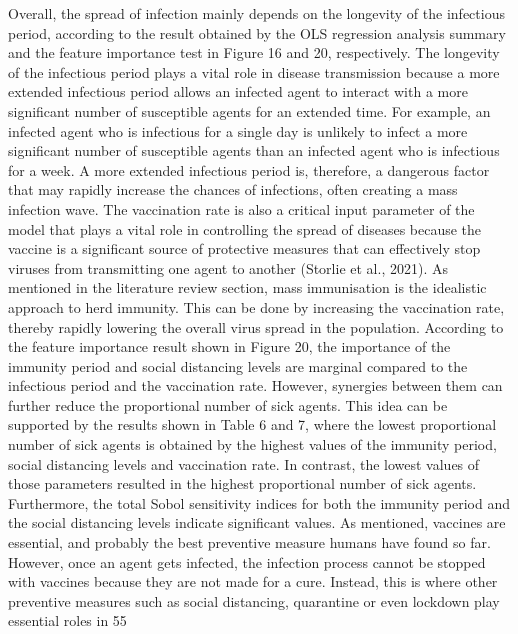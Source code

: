 \documentclass[smallextended]{svjour3}       %
\begin{document}
Overall, the spread of infection mainly depends on the longevity of the infectious period, according to the result obtained by the OLS regression analysis summary and the feature importance test in Figure 16 and 20, respectively. The longevity of the infectious period plays a vital role in disease transmission because a more extended infectious period allows an infected agent to interact with a more significant number of susceptible agents for an extended time. For example, an infected agent who is infectious for a single day is unlikely to infect a more significant number of susceptible agents than an infected agent who is infectious for a week. A more extended infectious period is, therefore, a dangerous factor that may rapidly increase the chances of infections, often creating a mass infection wave.
The vaccination rate is also a critical input parameter of the model that plays a vital role in controlling the spread of diseases because the vaccine is a significant source of protective measures that can effectively stop viruses from transmitting one agent to another (Storlie et al., 2021). As mentioned in the literature review section, mass immunisation is the idealistic approach to herd immunity. This can be done by increasing the vaccination rate, thereby rapidly lowering the overall virus spread in the population.
According to the feature importance result shown in Figure 20, the importance of the immunity period and social distancing levels are marginal compared to the infectious period and the vaccination rate. However, synergies between them can further reduce the proportional number of sick agents. This idea can be supported by the results shown in Table 6 and 7, where the lowest proportional number of sick agents is obtained by the highest values of the immunity period, social distancing levels and vaccination rate. In contrast, the lowest values of those parameters resulted in the highest proportional number of sick agents. Furthermore, the total Sobol sensitivity indices for both the immunity period and the social distancing levels indicate significant values.
As mentioned, vaccines are essential, and probably the best preventive measure humans have found so far. However, once an agent gets infected, the infection process cannot be stopped with vaccines because they are not made for a cure. Instead, this is where other preventive measures such as social distancing, quarantine or even lockdown play essential roles in
55
\end{document}
